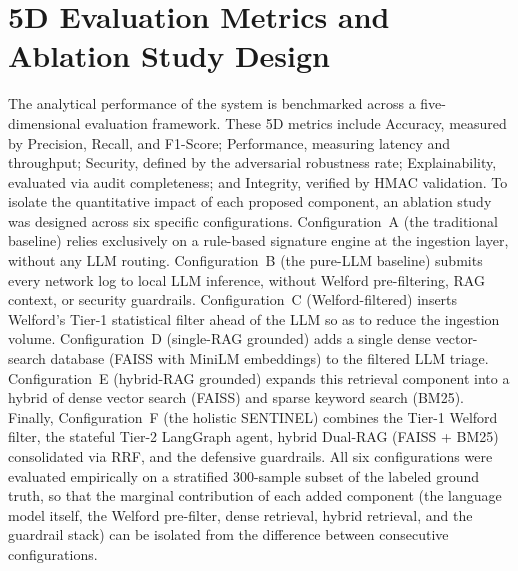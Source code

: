 \section{5D Evaluation Metrics and Ablation Study Design}
The analytical performance of the system is benchmarked across a five-dimensional evaluation framework. These 5D metrics include Accuracy, measured by Precision, Recall, and F1-Score; Performance, measuring latency and throughput; Security, defined by the adversarial robustness rate; Explainability, evaluated via audit completeness; and Integrity, verified by HMAC validation. To isolate the quantitative impact of each proposed component, an ablation study was designed across six specific configurations. Configuration~A (the traditional baseline) relies exclusively on a rule-based signature engine at the ingestion layer, without any LLM routing. Configuration~B (the pure-LLM baseline) submits every network log to local LLM inference, without Welford pre-filtering, RAG context, or security guardrails. Configuration~C (Welford-filtered) inserts Welford's Tier-1 statistical filter ahead of the LLM so as to reduce the ingestion volume. Configuration~D (single-RAG grounded) adds a single dense vector-search database (FAISS with MiniLM embeddings) to the filtered LLM triage. Configuration~E (hybrid-RAG grounded) expands this retrieval component into a hybrid of dense vector search (FAISS) and sparse keyword search (BM25). Finally, Configuration~F (the holistic SENTINEL) combines the Tier-1 Welford filter, the stateful Tier-2 LangGraph agent, hybrid Dual-RAG (FAISS + BM25) consolidated via RRF, and the defensive guardrails.
All six configurations were evaluated empirically on a stratified 300-sample subset of the labeled ground truth, so that the marginal contribution of each added component (the language model itself, the Welford pre-filter, dense retrieval, hybrid retrieval, and the guardrail stack) can be isolated from the difference between consecutive configurations.


